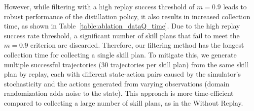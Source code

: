 However, while filtering with a high replay success threshold of \( m = 0.9 \) leads to robust performance of the distillation policy, it also results in increased collection time, as shown in Table~\ref{table:ablation_dataQ_time}. Due to the high replay success rate threshold, a significant number of skill plans that fail to meet the \( m = 0.9 \) criterion are discarded. Therefore, our filtering method has the longest collection time for collecting a single skill plan. To mitigate this, we generate multiple successful trajectories (30 trajectories per skill plan) from the same skill plan by replay, each with different state-action pairs caused by the simulator's stochasticity and the actions generated from varying observations (domain randomization adds noise to the state). This approach is more time-efficient compared to collecting a large number of skill plans, as in the Without Replay.


